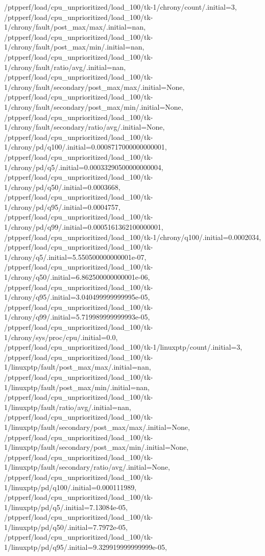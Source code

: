{    /ptpperf/load/cpu_unprioritized/load_100/tk-1/chrony/count/.initial=3,
    /ptpperf/load/cpu_unprioritized/load_100/tk-1/chrony/fault/post_max/max/.initial=nan,
    /ptpperf/load/cpu_unprioritized/load_100/tk-1/chrony/fault/post_max/min/.initial=nan,
    /ptpperf/load/cpu_unprioritized/load_100/tk-1/chrony/fault/ratio/avg/.initial=nan,
    /ptpperf/load/cpu_unprioritized/load_100/tk-1/chrony/fault/secondary/post_max/max/.initial=None,
    /ptpperf/load/cpu_unprioritized/load_100/tk-1/chrony/fault/secondary/post_max/min/.initial=None,
    /ptpperf/load/cpu_unprioritized/load_100/tk-1/chrony/fault/secondary/ratio/avg/.initial=None,
    /ptpperf/load/cpu_unprioritized/load_100/tk-1/chrony/pd/q100/.initial=0.0008717000000000001,
    /ptpperf/load/cpu_unprioritized/load_100/tk-1/chrony/pd/q5/.initial=0.00033290500000000004,
    /ptpperf/load/cpu_unprioritized/load_100/tk-1/chrony/pd/q50/.initial=0.0003668,
    /ptpperf/load/cpu_unprioritized/load_100/tk-1/chrony/pd/q95/.initial=0.0004757,
    /ptpperf/load/cpu_unprioritized/load_100/tk-1/chrony/pd/q99/.initial=0.0005161362100000001,
    /ptpperf/load/cpu_unprioritized/load_100/tk-1/chrony/q100/.initial=0.0002034,
    /ptpperf/load/cpu_unprioritized/load_100/tk-1/chrony/q5/.initial=5.550500000000001e-07,
    /ptpperf/load/cpu_unprioritized/load_100/tk-1/chrony/q50/.initial=6.862500000000001e-06,
    /ptpperf/load/cpu_unprioritized/load_100/tk-1/chrony/q95/.initial=3.040499999999995e-05,
    /ptpperf/load/cpu_unprioritized/load_100/tk-1/chrony/q99/.initial=5.719989999999993e-05,
    /ptpperf/load/cpu_unprioritized/load_100/tk-1/chrony/sys/proc/cpu/.initial=0.0,
    /ptpperf/load/cpu_unprioritized/load_100/tk-1/linuxptp/count/.initial=3,
    /ptpperf/load/cpu_unprioritized/load_100/tk-1/linuxptp/fault/post_max/max/.initial=nan,
    /ptpperf/load/cpu_unprioritized/load_100/tk-1/linuxptp/fault/post_max/min/.initial=nan,
    /ptpperf/load/cpu_unprioritized/load_100/tk-1/linuxptp/fault/ratio/avg/.initial=nan,
    /ptpperf/load/cpu_unprioritized/load_100/tk-1/linuxptp/fault/secondary/post_max/max/.initial=None,
    /ptpperf/load/cpu_unprioritized/load_100/tk-1/linuxptp/fault/secondary/post_max/min/.initial=None,
    /ptpperf/load/cpu_unprioritized/load_100/tk-1/linuxptp/fault/secondary/ratio/avg/.initial=None,
    /ptpperf/load/cpu_unprioritized/load_100/tk-1/linuxptp/pd/q100/.initial=0.000111989,
    /ptpperf/load/cpu_unprioritized/load_100/tk-1/linuxptp/pd/q5/.initial=7.13084e-05,
    /ptpperf/load/cpu_unprioritized/load_100/tk-1/linuxptp/pd/q50/.initial=7.7972e-05,
    /ptpperf/load/cpu_unprioritized/load_100/tk-1/linuxptp/pd/q95/.initial=9.329919999999999e-05,
}

